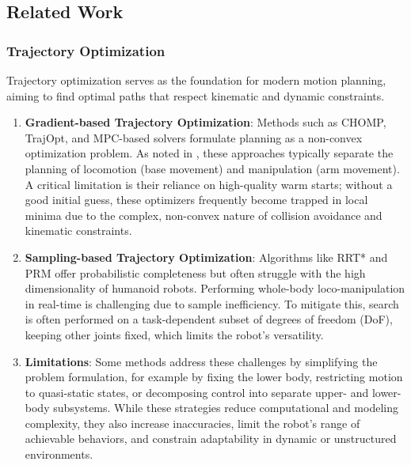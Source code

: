 \subsection{Related Work}\label{related-work}

\subsubsection{Trajectory Optimization}
Trajectory optimization serves as the foundation for modern motion planning, aiming to find optimal paths that respect kinematic and dynamic constraints.
\begin{enumerate}
    \item \textbf{Gradient-based Trajectory Optimization}: Methods such as CHOMP, TrajOpt, and MPC-based solvers formulate planning as a non-convex optimization problem. As noted in \cite{gu2025humanoidlocomotionmanipulationcurrent}, these approaches typically separate the planning of locomotion (base movement) and manipulation (arm movement). A critical limitation is their reliance on high-quality warm starts; without a good initial guess, these optimizers frequently become trapped in local minima due to the complex, non-convex nature of collision avoidance and kinematic constraints.
    \item \textbf{Sampling-based Trajectory Optimization}: Algorithms like RRT* and PRM offer probabilistic completeness but often struggle with the high dimensionality of humanoid robots. Performing whole-body loco-manipulation in real-time is challenging due to sample inefficiency. To mitigate this, search is often performed on a task-dependent subset of degrees of freedom (DoF), keeping other joints fixed, which limits the robot's versatility.
    \item \textbf{Limitations}: Some methods address these challenges by simplifying the problem formulation, for example by fixing the lower body, restricting motion to quasi-static states, or decomposing control into separate upper- and lower-body subsystems. While these strategies reduce computational and modeling complexity, they also increase inaccuracies, limit the robot's range of achievable behaviors, and constrain adaptability in dynamic or unstructured environments.
\end{enumerate}

